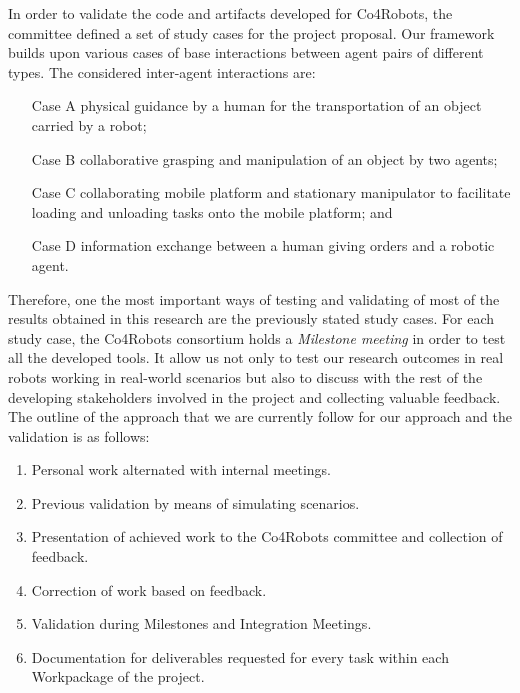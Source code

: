 In order to validate the code and artifacts developed for Co4Robots, the committee defined a set of study cases for the project proposal.
Our framework builds upon various cases of base interactions between agent pairs of different types. 
The considered inter-agent interactions are:
\begin{itemize}
\item[Case A] physical guidance by a human for the transportation of an object carried by a robot;
\item[Case B] collaborative grasping and manipulation of an object by two agents;
\item[Case C]collaborating mobile platform and stationary manipulator to facilitate loading and unloading tasks onto the mobile platform; and
\item[Case D] information exchange between a human giving orders and a robotic agent. 
\end{itemize}

Therefore, one the most important ways of testing and validating of most of the results obtained in this research are the previously stated study cases.
For each study case, the Co4Robots consortium holds a \emph{Milestone meeting} in order to test all the developed tools.
It allow us not only to test our research outcomes in real robots working in real-world scenarios but also to discuss with the rest of the developing stakeholders involved in the project and collecting valuable feedback.
The outline of the approach that we are currently follow for our approach and the validation is as follows:
\begin{enumerate}
\item Personal work alternated with internal meetings.
\item Previous validation by means of simulating scenarios.
\item Presentation of achieved work to the Co4Robots committee and collection of feedback.
\item Correction of work based on feedback.
\item Validation during Milestones and Integration Meetings.
\item Documentation for deliverables requested for every task within each Workpackage of the project.
\end{enumerate}





